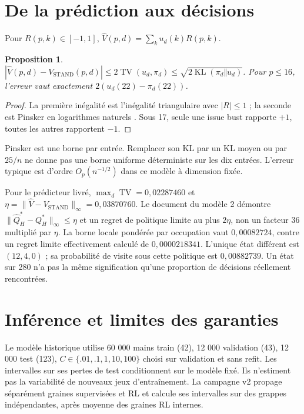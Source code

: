 \documentclass[11pt,a4paper]{article}
\newtheorem{proposition}{Proposition}
\theoremstyle{remark}\newtheorem*{remarque}{Remarque}
\newcommand{\KL}{\operatorname{KL}}
\newcommand{\TV}{\operatorname{TV}}
\newcommand{\VS}{V_{\mathrm{STAND}}}
\newcommand{\1}{\mathbf 1}
\begin{document}
\section{De la prédiction aux décisions}
Pour $R(p,k)\in[-1,1]$, $\widehat V(p,d)=\sum_ku_d(k)R(p,k)$.
\begin{proposition}
$|\widehat V(p,d)-\VS(p,d)|\le2\TV(u_d,\pi_d)
\le\sqrt{2\KL(\pi_d\Vert u_d)}$.
Pour $p\le16$, l'erreur vaut exactement $2(u_d(22)-\pi_d(22))$.
\end{proposition}
\begin{proof}
La première inégalité est l'inégalité triangulaire avec $|R|\le1$ ; la
seconde est Pinsker en logarithmes naturels \cite{cover}. Sous 17, seule une issue bust
rapporte $+1$, toutes les autres rapportent $-1$.
\end{proof}
Pinsker est une borne par entrée. Remplacer son KL par un KL moyen ou par
$25/n$ ne donne pas une borne uniforme déterministe sur les dix entrées.
L'erreur typique est d'ordre $O_p(n^{-1/2})$ dans ce modèle à dimension fixée.

Pour le prédicteur livré, $\max_d\TV=0{,}02287460$ et
$\eta=\|\widehat V-\VS\|_\infty=0{,}03870760$.
Le document du modèle 2 démontre $\|\widehat Q^*_H-Q^*_H\|_\infty\le\eta$
et un regret de politique limite au plus $2\eta$, non un facteur 36 multiplié
par $\eta$. La borne locale pondérée par occupation vaut $0{,}00082724$,
contre un regret limite effectivement calculé de $0{,}0000218341$.
L'unique état différent est $(12,4,0)$ ; sa probabilité de visite sous cette
politique est $0{,}00882739$. Un état sur 280 n'a pas la même signification
qu'une proportion de décisions réellement rencontrées.

\section{Inférence et limites des garanties}
Le modèle historique utilise 60 000 mains train (42), 12 000 validation (43),
12 000 test (123), $C\in\{.01,.1,1,10,100\}$ choisi sur validation et sans
refit. Les intervalles sur ses pertes de test conditionnent sur le modèle fixé.
Ils n'estiment pas la variabilité de nouveaux jeux d'entraînement.
La campagne v2 propage séparément graines supervisées et RL et calcule ses
intervalles sur des grappes indépendantes, après moyenne des graines RL internes.
\end{document}
